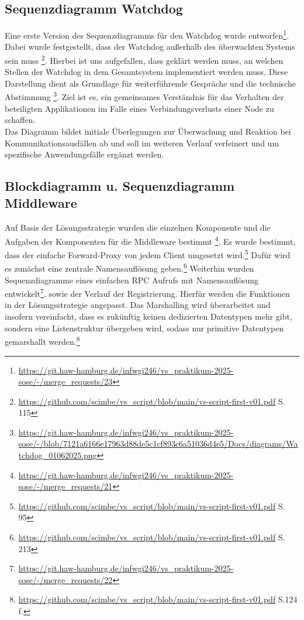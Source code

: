 \documentclass{article}
\begin{document}
\subsection{Sequenzdiagramm Watchdog}
Eine erste Version des Sequenzdiagramms für den Watchdog wurde entworfen\footnote{\url{https://git.haw-hamburg.de/infwgi246/vs_praktikum-2025-sose/-/merge_requests/23}}. Dabei wurde festgestellt, dass der Watchdog außerhalb des überwachten Systems sein muss \footnote{\url{https://github.com/scimbe/vs_script/blob/main/vs-script-first-v01.pdf} S. 115}. Hierbei ist uns aufgefallen, dass geklärt werden muss, an welchen Stellen der Watchdog in dem Gesamtsystem implementiert werden muss.
Diese Darstellung dient als Grundlage für weiterführende Gespräche und die technische Abstimmung \footnote{\url{https://git.haw-hamburg.de/infwgi246/vs_praktikum-2025-sose/-/blob/7121a6166e17963d88de5c1cf893c6a51036d4e5/Docs/diagrams/Watchdog_01062025.png}}. 
Ziel ist es, ein gemeinsames Verständnis für das Verhalten der beteiligten Applikationen im Falle eines Verbindungsverlusts einer Node zu schaffen.\\
Das Diagramm bildet initiale Überlegungen zur Überwachung und Reaktion bei Kommunikationsausfällen ab und soll im weiteren Verlauf verfeinert und um spezifische Anwendungsfälle ergänzt werden.


\subsection{Blockdiagramm u. Sequenzdiagramm Middleware}
Auf Basis der Lösungsstrategie wurden die einzelnen Komponente und die Aufgaben der Komponenten für die Middleware bestimmt \footnote{\url{https://git.haw-hamburg.de/infwgi246/vs_praktikum-2025-sose/-/merge_requests/21}}. Es wurde bestimmt, dass der einfache Forward-Proxy von jedem Client umgesetzt wird.\footnote{\url{https://github.com/scimbe/vs_script/blob/main/vs-script-first-v01.pdf} S. 95}
Dafür wird es zunächst eine zentrale Namensauflösung geben.\footnote{\url{https://github.com/scimbe/vs_script/blob/main/vs-script-first-v01.pdf} S. 213} Weiterhin wurden Sequenzdiagramme eines einfachen RPC Aufrufs mit Namensauflösung entwickelt\footnote{\url{https://git.haw-hamburg.de/infwgi246/vs_praktikum-2025-sose/-/merge_requests/22}}, sowie der Verlauf der Registrierung. 
Hierfür werden die Funktionen in der Lösungsstrategie angepasst. Das Marshalling wird überarbeitet und insofern vereinfacht, dass es zukünftig keinen dedizierten Datentypen mehr gibt, sondern eine Listenstruktur übergeben wird, 
sodass nur primitive Datentypen gemarshallt werden.\footnote{\url{https://github.com/scimbe/vs_script/blob/main/vs-script-first-v01.pdf} S.124 f.} 
\end{document}
